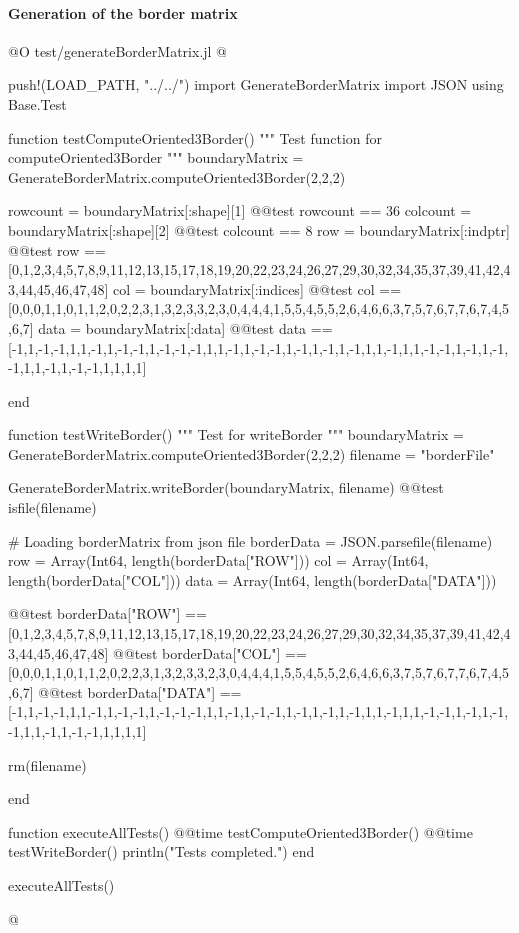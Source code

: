 \documentclass[11pt,oneside]{article}	%
\begin{document}
\paragraph{Generation of the border matrix}
@O test/generateBorderMatrix.jl
@{push!(LOAD_PATH, "../../")
import GenerateBorderMatrix
import JSON
using Base.Test

function testComputeOriented3Border()
  """
  Test function for computeOriented3Border
  """
  boundaryMatrix = GenerateBorderMatrix.computeOriented3Border(2,2,2)

  rowcount = boundaryMatrix[:shape][1]
  @@test rowcount == 36
  colcount = boundaryMatrix[:shape][2]
  @@test colcount == 8
  row = boundaryMatrix[:indptr]
  @@test row == [0,1,2,3,4,5,7,8,9,11,12,13,15,17,18,19,20,22,23,24,26,27,29,30,32,34,35,37,39,41,42,43,44,45,46,47,48]
  col = boundaryMatrix[:indices]
  @@test col == [0,0,0,1,1,0,1,1,2,0,2,2,3,1,3,2,3,3,2,3,0,4,4,4,1,5,5,4,5,5,2,6,4,6,6,3,7,5,7,6,7,7,6,7,4,5,6,7]
  data = boundaryMatrix[:data]
  @@test data == [-1,1,-1,-1,1,1,-1,1,-1,-1,1,-1,-1,-1,1,1,-1,1,-1,-1,1,-1,1,-1,1,-1,1,1,-1,1,1,-1,-1,1,-1,1,-1,-1,1,1,-1,1,-1,-1,1,1,1,1]

end

function testWriteBorder()
  """
  Test for writeBorder
  """
  boundaryMatrix = GenerateBorderMatrix.computeOriented3Border(2,2,2)
  filename = "borderFile"

  GenerateBorderMatrix.writeBorder(boundaryMatrix, filename)
  @@test isfile(filename)

  # Loading borderMatrix from json file
  borderData = JSON.parsefile(filename)
  row = Array(Int64, length(borderData["ROW"]))
  col = Array(Int64, length(borderData["COL"]))
  data = Array(Int64, length(borderData["DATA"]))

  @@test borderData["ROW"] == [0,1,2,3,4,5,7,8,9,11,12,13,15,17,18,19,20,22,23,24,26,27,29,30,32,34,35,37,39,41,42,43,44,45,46,47,48]
  @@test borderData["COL"] == [0,0,0,1,1,0,1,1,2,0,2,2,3,1,3,2,3,3,2,3,0,4,4,4,1,5,5,4,5,5,2,6,4,6,6,3,7,5,7,6,7,7,6,7,4,5,6,7]
  @@test borderData["DATA"] == [-1,1,-1,-1,1,1,-1,1,-1,-1,1,-1,-1,-1,1,1,-1,1,-1,-1,1,-1,1,-1,1,-1,1,1,-1,1,1,-1,-1,1,-1,1,-1,-1,1,1,-1,1,-1,-1,1,1,1,1]

  rm(filename)

end

function executeAllTests()
  @@time testComputeOriented3Border()
  @@time testWriteBorder()
  println("Tests completed.")
end

executeAllTests()

@}
\end{document}
